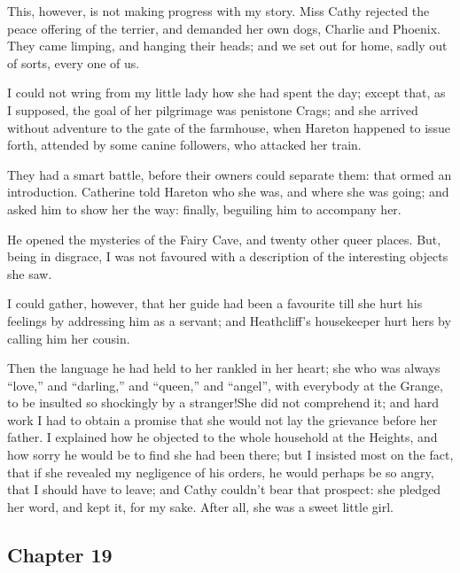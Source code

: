 \par This, however, is not making progress with my story. Miss Cathy rejected the peace offering of the terrier, and demanded her own dogs, Charlie and Phoenix. They came limping, and hanging their heads; and we set out for home, sadly out of sorts, every one of us.
\par I could not wring from my little lady how she had spent the day; except that, as I supposed, the goal of her pilgrimage was penistone Crags; and she arrived without adventure to the gate of the farmhouse, when Hareton happened to issue forth, attended by some canine followers, who attacked her train.
\par They had a smart battle, before their owners could separate them: that ormed an introduction. Catherine told Hareton who she was, and where she was going; and asked him to show her the way: finally, beguiling him to accompany her.
\par He opened the mysteries of the Fairy Cave, and twenty other queer places. But, being in disgrace, I was not favoured with a description of the interesting objects she saw.
\par I could gather, however, that her guide had been a favourite till she hurt his feelings by addressing him as a servant; and Heathcliff's housekeeper hurt hers by calling him her cousin.
\par Then the language he had held to her rankled in her heart; she who was always “love,” and “darling,” and “queen,” and “angel”, with everybody at the Grange, to be insulted so shockingly by a stranger!She did not comprehend it; and hard work I had to obtain a promise that she would not lay the grievance before her father. I explained how he objected to the whole household at the Heights, and how sorry he would be to find she had been there; but I insisted most on the fact, that if she revealed my negligence of his orders, he would perhaps be so angry, that I should have to leave; and Cathy couldn't bear that prospect: she pledged her word, and kept it, for my sake. After all, she was a sweet little girl.





\subsection*{Chapter 19}

